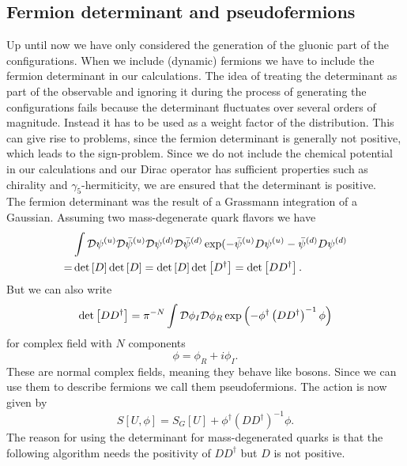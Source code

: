 \subsection{Fermion determinant and pseudofermions}
Up until now we have only considered the generation of the gluonic part of the configurations. When we include (dynamic) fermions we have to include the fermion determinant in our calculations. The idea of treating the determinant as part of the observable and ignoring it during the process of generating the configurations fails because the determinant fluctuates over several orders of magnitude. Instead it has to be used as a weight factor of the distribution. This can give rise to problems, since the fermion determinant is generally not positive, which leads to the sign-problem. Since we do not include the chemical potential in our calculations and our Dirac operator has sufficient properties such as chirality and $\gamma_5$-hermiticity, we are ensured that the determinant is positive.\\
The fermion determinant was the result of a Grassmann integration of a Gaussian. Assuming two mass-degenerate quark flavors we have
\begin{align}
    &\int\mathcal D\psi^{(u)}\mathcal D\bar\psi^{(u)}\mathcal D\psi^{(d)}\mathcal D\bar\psi^{(d)} \exp(-\bar\psi^{(u)}D\psi^{(u)}-\bar\psi^{(d)}D\psi^{(d)}\\ =&\det\left[D\right]\det\left[D\right]=\det\left[D\right]\det\left[D^\dagger\right]=\det\left[DD^\dagger\right].
\end{align}
But we can also write 
\begin{equation}
    \det\left[DD^\dagger\right]=\pi^{-N}\int\mathcal D\phi_I\mathcal{D}\phi_R\exp\left(-\phi^\dagger\left(DD^\dagger\right)^{-1}\phi\right)
\end{equation}
for complex field with $N$ components 
\begin{equation}
    \phi=\phi_R+i\phi_I. 
\end{equation}
These are normal complex fields, meaning they behave like bosons. Since we can use them to describe fermions we call them pseudofermions. The action is now given by
\begin{equation}
    S[U,\phi]=S_G[U]+\phi^\dagger(DD^\dagger)^{-1}\phi.
\end{equation}
The reason for using the determinant for mass-degenerated quarks is that the following algorithm needs the positivity of $DD^\dagger$ but $D$ is not positive.  
